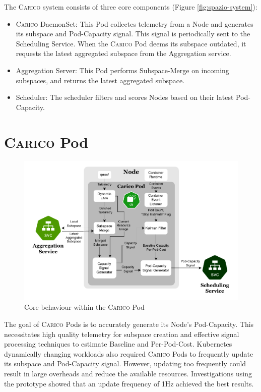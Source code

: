 The \textsc{Carico} system consists of three core components (Figure
\ref{fig:spazio-system}):
\begin{itemize}
    \item \textsc{Carico} DaemonSet: This Pod collectes telemetry from a
        Node and generates its subspace and Pod-Capacity  signal. This signal is
        periodically sent to the Scheduling Service. When the \textsc{Carico}
        Pod deems its subspace outdated, it requests the latest aggregated
        subspace from the Aggregation service.
    \item Aggregation Server: This Pod performs Subspace-Merge on incoming
        subspaces, and returns the latest aggregated subspace.
    \item Scheduler: The scheduler filters and scores Nodes based on their
        latest Pod-Capacity.
\end{itemize}

\section{\textsc{Carico} Pod}
\begin{figure}[H]
    \centering
    \includegraphics[width=\textwidth]{images/carico-pod.pdf}
    \caption{Core behaviour within the \textsc{Carico} Pod}
    \label{spazio-pod-components}
\end{figure}
The goal of \textsc{Carico} Pods is to accurately generate its Node's
Pod-Capacity. This necessitates high quality telemetry for subspace creation and
effective signal processing techniques to estimate Baseline and Per-Pod-Cost.
Kubernetes dynamically changing workloads also required \textsc{Carico} Pods to
frequently update its subspace and Pod-Capacity signal. However, updating too
frequently could result in large overheads and reduce the available resources.
Investigations using the prototype showed that an update frequency of 1Hz
achieved the best results.

